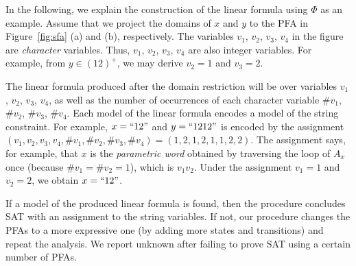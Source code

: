 \documentclass[sigplan,review,anonymous]{acmart}\settopmatter{printfolios=true,printccs=false,printacmref=false}
\begin{document}
In the following, we explain the construction of the linear formula using $\Phi$ as an example. Assume that we project the domains of $x$ and $y$ to the PFA in Figure~\ref{fig:sfa} (a) and (b), respectively. The variables $v_1$, $v_2$, $v_3$, $v_4$ in the figure are \emph{character} variables. Thus, $v_1$, $v_2$, $v_3$, $v_4$ are also integer variables. For example, from  $ y \in (12)^+$, we may derive $v_2=1$ and $v_3=2$. 

The linear formula produced after the domain restriction will be over variables $v_1$, $v_2$, $v_3$, $v_4$, as well as the number of occurrences of each character variable $\#v_1$, $\#v_2$, $\#v_3$, $\#v_4$. Each model of the linear formula encodes a model of the string constraint. For example, $x=``12"$ and $y=``1212"$ is encoded by the assignment $(v_1,v_2,v_3,v_4,\#v_1,\#v_2,\#v_3,\#v_4)= (1,2,1,2,1,1,2,2)$. The assignment says, for example, that $x$ is the \emph{parametric word} obtained by traversing the loop of $A_x$ once (because $\#v_1 = \#v_2 = 1$), which is $v_1v_2$. Under the assignment $v_1=1$ and $v_2=2$, we obtain $x=``12"$.

If a model of the produced linear formula is found, then the procedure concludes SAT with an assignment to the string variables. If not, our procedure changes the PFAs to a more expressive one (by adding more states and transitions) and repeat the analysis.  We report unknown after failing to prove SAT using a certain number of PFAs.
\end{document}
